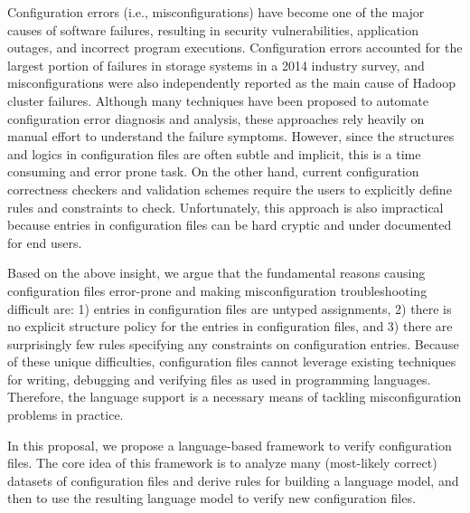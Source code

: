 Configuration errors (i.e., misconfigurations) have become one of the major causes of software failures, resulting in security vulnerabilities, application outages, and incorrect program executions. 
Configuration errors accounted for the largest portion of failures in storage systems in a 2014 industry survey, and misconfigurations were also independently reported as the main cause of Hadoop cluster failures. 
Although many techniques have been proposed to automate configuration error diagnosis and analysis, these approaches rely heavily on manual effort to understand the failure symptoms. 
However, since the structures and logics in configuration files are often subtle and implicit, this is a time consuming and error prone task.
On the other hand, current configuration correctness checkers and validation schemes require the users to explicitly define rules and constraints to check.
Unfortunately, this approach is also impractical because entries in configuration files can be hard cryptic and under documented for end users.

Based on the above insight, we argue that the fundamental reasons causing configuration files error-prone and making misconfiguration troubleshooting difficult are: 
  1) entries in configuration files are untyped assignments, 
  2) there is no explicit structure policy for the entries in configuration files, and 
  3) there are surprisingly few rules specifying any constraints on configuration entries.
Because of these unique difficulties, configuration files cannot leverage existing techniques for writing, debugging and verifying files as used in programming languages. 
Therefore, the language support is a necessary means of tackling misconfiguration problems in practice.

In this proposal, we propose a language-based framework to verify configuration files. 
The core idea of this framework is to analyze many (most-likely correct) datasets of configuration files and derive rules for building a language model, and then to use the resulting language model to verify new configuration files.

